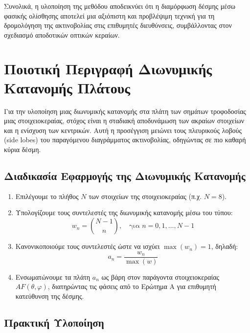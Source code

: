 \documentclass[a4paper,12pt]{report}
\newcommand{\en}{\selectlanguage{english}}
\newcommand{\gr}{\selectlanguage{greek}}
\begin{document}
\hspace{-0.6cm}Συνολικά, η υλοποίηση της μεθόδου αποδεικνύει ότι η διαμόρφωση δέσμης μέσω φασικής ολίσθησης αποτελεί μια αξιόπιστη και προβλέψιμη τεχνική για τη δρομολόγηση της ακτινοβολίας στις επιθυμητές διευθύνσεις, συμβάλλοντας στον σχεδιασμό αποδοτικών οπτικών κεραίων.

\vspace{0.5cm}

\section{Ποιοτική Περιγραφή Διωνυμικής Κατανομής Πλάτους}

Για την υλοποίηση μιας διωνυμικής κατανομής στα πλάτη των σημάτων τροφοδοσίας μιας στοιχειοκεραίας, στόχος είναι η σταδιακή αποδυνάμωση των ακραίων στοιχείων και η ενίσχυση των κεντρικών. Αυτή η προσέγγιση μειώνει τους πλευρικούς λοβούς \en (side lobes) \gr του παραγόμενου διαγράμματος ακτινοβολίας, οδηγώντας σε πιο καθαρή κύρια δέσμη.

\subsection{Διαδικασία Εφαρμογής της Διωνυμικής Κατανομής}

\begin{enumerate}
    \item Επιλέγουμε το πλήθος \( N \) των στοιχείων της στοιχειοκεραίας (π.χ. \( N = 8 \)).
    
    \item Υπολογίζουμε τους συντελεστές της διωνυμικής κατανομής μέσω του τύπου:
    \[
    w_n = \binom{N-1}{n}, \quad \text{για } n = 0, 1, \dots, N-1
    \]
    
    \item Κανονικοποιούμε τους συντελεστές ώστε να ισχύει \( \max(w_n) = 1 \), δηλαδή:
    \[
    a_n = \frac{w_n}{\max(w)}
    \]
    
    \item Ενσωματώνουμε τα πλάτη \( a_n \) ως βάρη στον παράγοντα στοιχειοκεραίας \( AF(\theta, \varphi) \), διατηρώντας τις φάσεις από το Ερώτημα Α για επιθυμητή κατεύθυνση της δέσμης.
\end{enumerate}

\subsection{Πρακτική Υλοποίηση}
\end{document}
